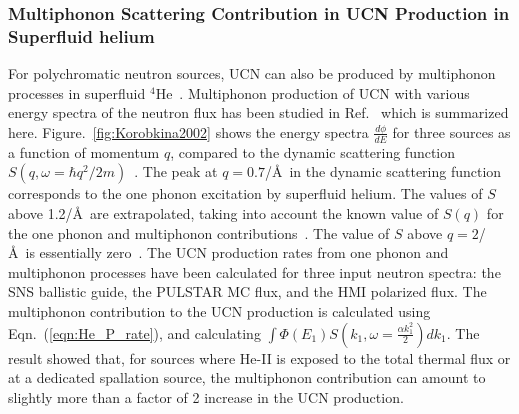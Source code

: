 

 \subsubsection{Multiphonon Scattering Contribution in UCN Production
   in Superfluid helium}
 For polychromatic neutron sources, UCN can also be produced by
 multiphonon processes in superfluid
 $^4$He~\cite{Korobkina2002,Schmidt2009}. Multiphonon production of
 UCN with various energy spectra of the neutron flux has been studied
 in Ref.~\cite{Korobkina2002} which is summarized
 here. Figure.~\ref{fig:Korobkina2002} shows the energy spectra
 $\frac{d\phi}{dE}$ for three sources as a function of momentum $q$,
 compared to the dynamic scattering function
 $S(q,\omega=\hbar q^2/2m)$~\cite{Korobkina2002}.
 The peak at $q=0.7$/\AA~in the dynamic scattering function
 corresponds to the one phonon excitation by superfluid helium. The
 values of $S$ above 1.2/\AA~are extrapolated, taking into account the
 known value of $S(q)$ for the one phonon and multiphonon
 contributions~\cite{Korobkina2002}. The value of $S$ above
 $q=2$/\AA~is essentially zero~\cite{Korobkina2002}.  The UCN
 production rates from one phonon and multiphonon processes have been
 calculated for three input neutron spectra: the SNS ballistic guide,
 the PULSTAR MC flux, and the HMI polarized flux.  The multiphonon
 contribution to the UCN production is calculated using
 Eqn.~(\ref{eqn:He_P_rate}), and calculating
 $\int \Phi(E_1)S(k_1,\omega=\frac{\alpha k_1^2}{2}) dk_1$.  The
 result showed that, for sources where He-II is exposed to the total
 thermal flux or at a dedicated spallation source, the multiphonon
 contribution can amount to slightly more than a factor of 2 increase
 in the UCN production.



